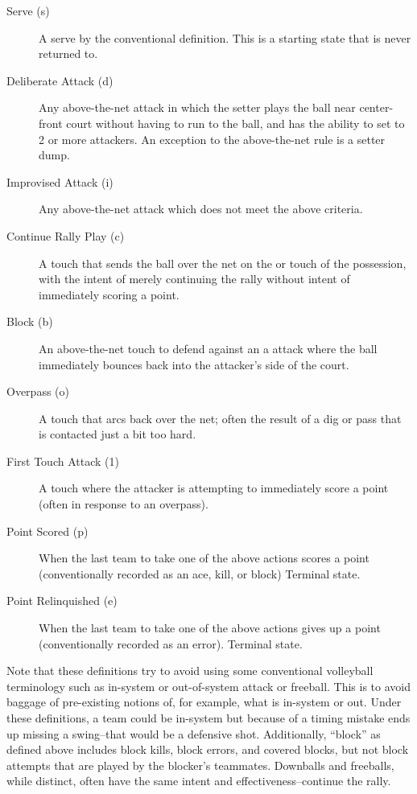 \documentclass{IOS-Book-Article}
\begin{document}
\begin{description}
    \item [Serve (s)] A serve by the conventional definition. This is a starting state that is never
          returned to.
    \item [Deliberate Attack (d)] Any above-the-net attack in which the setter plays the ball near
          center-front court without having to run to the ball, and has the ability to set to 2 or 
          more attackers. An exception to the above-the-net rule is a setter dump.
    \item [Improvised Attack (i)] Any above-the-net attack which does not meet the above criteria.
    \item [Continue Rally Play (c)] A touch that sends the ball over the net on the  or 
           touch of the possession, with the intent of merely continuing the rally without
          intent of immediately scoring a point.
    \item [Block (b)] An above-the-net  touch to defend against an a attack where the ball
          immediately bounces back into the attacker's side of the court.
    \item [Overpass (o)] A  touch that arcs back over the net; often the result of a dig or         pass that is contacted just a bit too hard.
    \item [First Touch Attack (1)] A  touch where the attacker is attempting to immediately
          score a point (often in response to an overpass).
    \item [Point Scored (p)] When the last team to take one of the above actions scores a point
          (conventionally recorded as an ace, kill, or block) Terminal state.
    \item [Point Relinquished (e)] When the last team to take one of the above actions gives up 
          a point (conventionally recorded as an error). Terminal state.
\end{description}

Note that these definitions try to avoid using some conventional volleyball terminology such as 
in-system or out-of-system attack or freeball.  This is to avoid baggage of pre-existing notions
of, for example, what is in-system or out.  Under these definitions, a team could be in-system but
because of a timing mistake ends up missing a swing--that would be a defensive shot. Additionally,
``block'' as defined above includes block kills, block errors, and covered blocks, but not block
attempts that are played by the blocker's teammates. Downballs and freeballs, while distinct, often
have the same intent and effectiveness--continue the rally.
\end{document}
